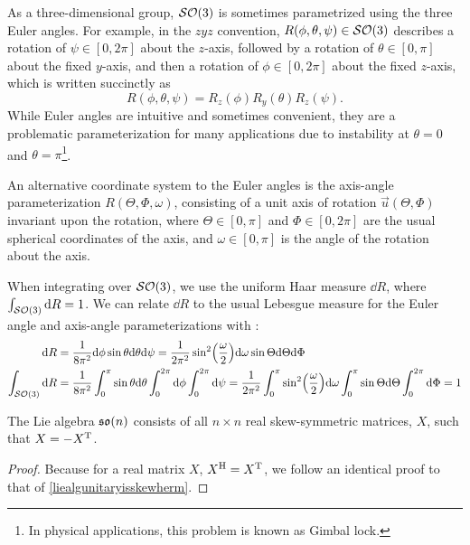 \documentclass[../../main.tex]{subfiles}
\begin{document}
\begin{refsection}
	As a three-dimensional group, $\mathcal{SO} (3)$ is sometimes parametrized using the three Euler angles.
	For example, in the $zyz$ convention, $R(\phi,\theta,\psi) \in \mathcal{SO} (3)$ describes a rotation of $\psi \in [0, 2\pi]$ about the $z$-axis, followed by a rotation of $\theta \in [0, \pi]$ about the fixed $y$-axis, and then a rotation of $\phi \in [0, 2\pi]$ about the fixed $z$-axis, which is written succinctly as
	$$R(\phi, \theta, \psi) = R_z(\phi) R_y(\theta) R_z(\psi).$$
	While Euler angles are intuitive and sometimes convenient, they are a problematic parameterization for many applications due to instability at $\theta=0$ and $\theta=\pi$\footnote{
		In physical applications, this problem is known as Gimbal lock.
	}.

	An alternative coordinate system to the Euler angles is the axis-angle parameterization $R(\Theta, \Phi, \omega)$, consisting of a unit axis of rotation $\vec{u}(\Theta, \Phi)$ invariant upon the rotation, where $\Theta \in [0, \pi]$ and $\Phi \in [0, 2\pi]$ are the usual spherical coordinates of the axis, and $\omega \in [0, \pi]$ is the angle of the rotation about the axis.

	When integrating over $\mathcal{SO} (3)$, we use the uniform Haar measure $\dd{R}$, where $\int_{\mathcal{SO} (3)} \dd{R} = 1$.
	We can relate $\dd{R}$ to the usual Lebesgue measure for the Euler angle and axis-angle parameterizations with \cite[Section 1.4.4]{varshalovichQuantumTheoryAngular1988}:
	\begin{align}
		              & \dd{R} = \frac{1}{8 \pi^2} \dd\phi \sin\theta \dd\theta \dd\psi
		= \frac{1}{2 \pi^2} \sin[2](\frac{\omega}{2}) \dd\omega \sin\Theta \dd\Theta \dd\Phi                                   \\
		\int_{\mathcal{SO} (3)} & \dd{R} = \frac{1}{8 \pi^2} \int_0^\pi \sin\theta \dd\theta \int_0^{2\pi} \dd\phi \int_0^{2\pi} \dd\psi
		= \frac{1}{2 \pi^2} \int_0^\pi \sin[2](\frac{\omega}{2}) \dd\omega \int_0^\pi \sin\Theta \dd\Theta \int_0^{2\pi} \dd\Phi
		= 1 \label{so3measure}
	\end{align}

	\begin{theorem}
		The Lie algebra $\mathfrak{so} (n)$ consists of all $n \times n$ real skew-symmetric matrices, $X$, such that $X = -{X}^\mathrm{T}$.
	\end{theorem}
	\begin{proof}
		Because for a real matrix $X$, ${X}^\mathrm{H} = {X}^\mathrm{T}$, we follow an identical proof to that of \cref{liealgunitaryisskewherm}.
	\end{proof}


\end{refsection}
\end{document}
